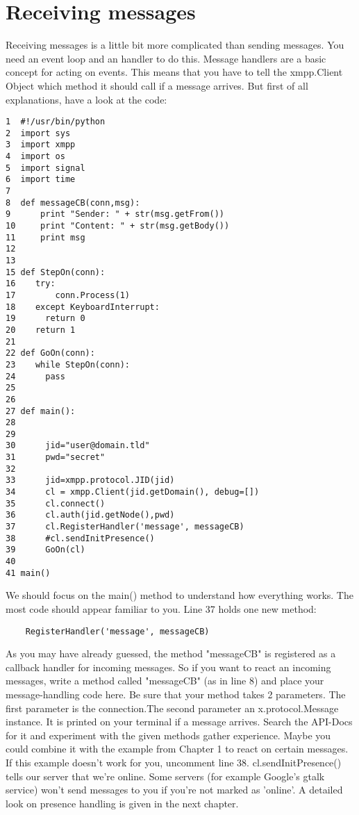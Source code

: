 \section{Receiving messages}

Receiving messages is a little bit more complicated than sending messages. You need an event loop and an handler to do this.
\newline
Message handlers are a basic concept for acting on events. This means that you have to tell the xmpp.Client Object which method it should call if a message arrives. But first of all explanations, have a look at the code:
\newline
\newline
\begin{verbatim}
1  #!/usr/bin/python
2  import sys
3  import xmpp
4  import os
5  import signal
6  import time
7
8  def messageCB(conn,msg):
9      print "Sender: " + str(msg.getFrom())
10     print "Content: " + str(msg.getBody())
11     print msg
12
13
15 def StepOn(conn):
16    try:
17        conn.Process(1)
18    except KeyboardInterrupt:
19	    return 0
20    return 1
21
22 def GoOn(conn):
23    while StepOn(conn):
24	    pass
25
26
27 def main():
28
29
30      jid="user@domain.tld"
31      pwd="secret"
32
33      jid=xmpp.protocol.JID(jid)
34      cl = xmpp.Client(jid.getDomain(), debug=[])
35      cl.connect()
36      cl.auth(jid.getNode(),pwd)
37      cl.RegisterHandler('message', messageCB)
38      #cl.sendInitPresence()
39      GoOn(cl)
40
41 main()
\end{verbatim}
We should focus on the main() method to understand how everything works. The most code should appear familiar to you. Line 37 holds one new method: \begin{verbatim}	RegisterHandler('message', messageCB)\end{verbatim}
As you may have already guessed, the method "messageCB" is registered as a callback handler for incoming messages. So if you want to react an incoming messages, write a method called "messageCB" (as in line 8)
and place your message-handling code here. Be sure that your method takes 2 parameters.
The first parameter is the connection.The second parameter an x.protocol.Message instance. It is printed on your terminal if a message arrives. Search the API-Docs for it and experiment with the given methods gather experience. Maybe you could combine it with the example from Chapter 1 to react on certain messages.
\newline
\newline
If this example doesn't work for you, uncomment line 38. cl.sendInitPresence() tells our server that we're online. Some servers (for example Google's gtalk service) won't send messages to you if you're not marked as 'online'. A detailed look on presence handling is given in the next chapter.


